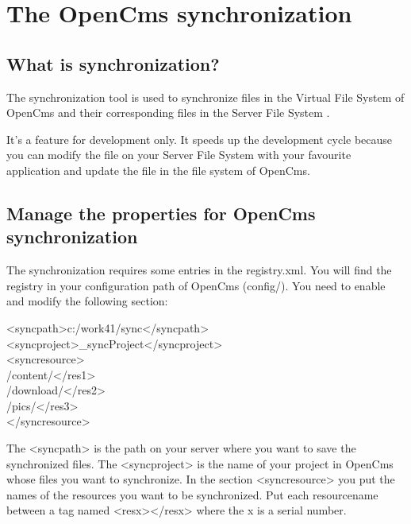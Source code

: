 \chapter{The OpenCms synchronization}
\label{synchronization}

\section{What is synchronization?}
The synchronization tool  is used to synchronize  files in the Virtual File System  of OpenCms and their corresponding files in the Server File System .

It's a feature for development only. It speeds up the development cycle because you can modify the file on your Server File System with your favourite application and update the file in the file system of OpenCms.

\section{Manage the properties for OpenCms synchronization}
The synchronization requires some entries in the {\dir
registry.xml}. You will find the registry in your configuration
path of OpenCms ({\dir config/}). You need to enable and modify
the following section:

\begin{xml}
<syncpath>c:/work41/sync</syncpath>\\
<syncproject>\_syncProject</syncproject>\\
<syncresource>\\
/content/</res1>\\
/download/</res2>\\
/pics/</res3>\\
</syncresource>\\
\end{xml}

The {\tag <syncpath>}  is the path on your server
where you want to save the synchronized files. The {\tag
<syncproject>}  is the name of your project in
OpenCms whose files you want to synchronize. In the section {\tag
<syncresource>}  you put the names of the
resources you want to be synchronized. Put each resourcename
between a tag named {\tag <resx></resx>} where the {\name x} is a
serial number.


